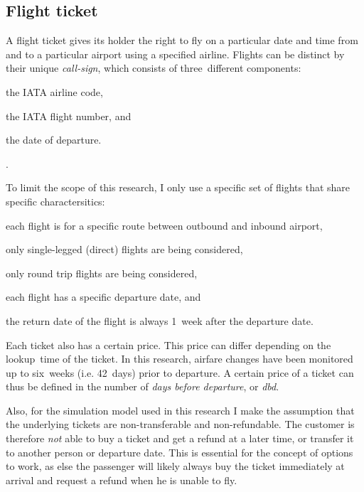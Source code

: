\subsection{Flight ticket}
\label{subsec:FlightTicket}
A flight ticket gives its holder the right to fly on a particular date and time from and to a particular airport using a specified airline. Flights can be distinct by their unique \emph{call-sign}, which consists of three~different components: \begin{inparaenum}
\item the IATA airline code,
\item the IATA flight number, and
\item the date of departure.
\end{inparaenum}.

\noindent
To limit the scope of this research, I only use a specific set of flights that share specific charactersitics:

\begin{compactitem}
\item each flight is for a specific route between outbound and inbound airport,
\item only single-legged (direct) flights are being considered,
\item only round trip flights are being considered,
\item each flight has a specific departure date, and
\item the return date of the flight is always 1~week after the departure date.
\end{compactitem}
\vspace{1em}

Each ticket also has a certain price. This price can differ depending on the lookup~time of the ticket. In this research, airfare changes have been monitored up to six~weeks (i.e. 42~days) prior to departure. A certain price of a ticket can thus be defined in the number of \emph{days before departure}, or \emph{dbd}.

Also, for the simulation model used in this research I make the assumption that the underlying tickets are non-transferable and non-refundable. The customer is therefore \emph{not} able to buy a ticket and get a refund at a later time, or transfer it to another person or departure date. This is essential for the concept of options to work, as else the passenger will likely always buy the ticket immediately at arrival and request a refund when he is unable to fly.

